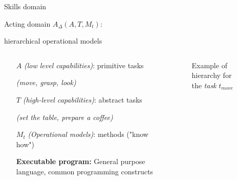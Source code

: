 \begin{frame}{Skills domain}
    \begin{center}
        \large
        Acting domain \textbf{$A_\Delta (A, T, M_t)$}:
        
        hierarchical operational models
    \end{center}
\begin{columns}
    \begin{column}{0.65\textwidth}
        
     \begin{itemize}
         \item[$A$] \textit{(low level capabilities)}: primitive tasks
         \pause
         
         \textit{\footnotesize(move, grasp, look)}
         \pause
         \item[$T$] \textit{(high-level capabilities)}: abstract tasks
         \pause

         \textit{\footnotesize(set the table, prepare a coffee)}
         \pause
         \item[$M_t$] \textit{(Operational models)}: methods
         ("know how")
         \footnotesize

         \textbf{Executable program: } General purpose language, common programming constructs
     \end{itemize}
    \end{column}
    \begin{column}{0.45\textwidth}
        \begin{figure}
            \caption{Example of hierarchy for the \textit{task} $t_{move}$}

            
        \end{figure}
    \end{column}
\end{columns}
    
\end{frame}
